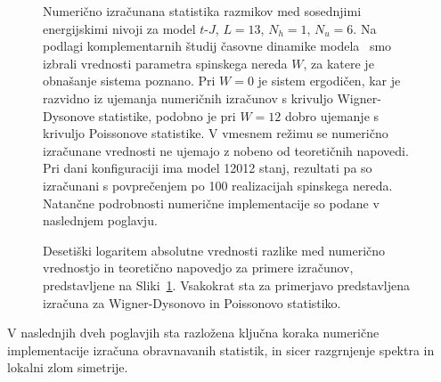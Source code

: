 \begin{figure}[H]
\caption{Numerično izračunana statistika razmikov med sosednjimi energijskimi nivoji za model $t$-$J$, $L=13$, $N_h=1$, $N_u=6$. Na podlagi komplementarnih študij časovne dinamike modela~\cite{lemut2017complete} smo izbrali vrednosti parametra spinskega nereda $W$, za katere je obnašanje sistema poznano. Pri $W=0$ je sistem ergodičen, kar je razvidno iz ujemanja numeričnih izračunov s krivuljo Wigner-Dysonove statistike, podobno je pri $W=12$ dobro ujemanje s krivuljo Poissonove statistike. V vmesnem režimu se numerično izračunane vrednosti ne ujemajo z nobeno od teoretičnih napovedi. Pri dani konfiguraciji ima model 12012 stanj, rezultati pa so izračunani s povprečenjem po 100 realizacijah spinskega nereda. Natančne podrobnosti numerične implementacije so podane v naslednjem poglavju.  }
\label{fig:unfolding_demo_three_slo}
\end{figure}
\begin{figure}[H]
\caption{Desetiški logaritem absolutne vrednosti razlike med numerično vrednostjo in teoretično napovedjo za primere izračunov, predstavljene na Sliki~\ref{fig:unfolding_demo_three_slo}. Vsakokrat sta za primerjavo predstavljena izračuna za Wigner-Dysonovo in Poissonovo statistiko. }
\label{fig:unfolding_demo_three_error_slo}
\end{figure}
\noindent
V naslednjih dveh poglavjih sta razložena ključna koraka numerične implementacije izračuna obravnavanih statistik, in sicer razgrnjenje spektra in lokalni zlom simetrije. 
